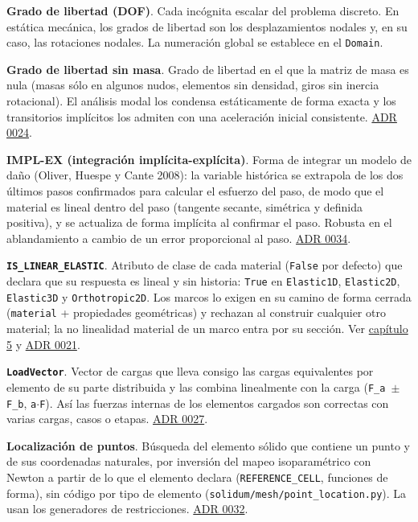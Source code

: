 \documentclass[11pt,oneside]{report}
\begin{document}
\textbf{Grado de libertad (DOF)}. Cada incógnita escalar del problema discreto. En estática mecánica, los grados de libertad son los desplazamientos nodales y, en su caso, las rotaciones nodales. La numeración global se establece en el \texttt{Domain}.

\textbf{Grado de libertad sin masa}. Grado de libertad en el que la matriz de masa es nula (masas sólo en algunos nudos, elementos sin densidad, giros sin inercia rotacional). El análisis modal los condensa estáticamente de forma exacta y los transitorios implícitos los admiten con una aceleración inicial consistente. \hyperref[adr:0024]{ADR 0024}.

\textbf{IMPL-EX (integración implícita-explícita)}. Forma de integrar un modelo de daño (Oliver, Huespe y Cante 2008): la variable histórica se extrapola de los dos últimos pasos confirmados para calcular el esfuerzo del paso, de modo que el material es lineal dentro del paso (tangente secante, simétrica y definida positiva), y se actualiza de forma implícita al confirmar el paso. Robusta en el ablandamiento a cambio de un error proporcional al paso. \hyperref[adr:0034]{ADR 0034}.

\textbf{\texttt{IS\_\allowbreak{}LINEAR\_\allowbreak{}ELASTIC}}. Atributo de clase de cada material (\texttt{False} por defecto) que declara que su respuesta es lineal y sin historia: \texttt{True} en \texttt{Elastic1D}, \texttt{Elastic2D}, \texttt{Elastic3D} y \texttt{Orthotropic2D}. Los marcos lo exigen en su camino de forma cerrada (\texttt{material} + propiedades geométricas) y rechazan al construir cualquier otro material; la no linealidad material de un marco entra por su sección. Ver \hyperref[cap:5]{capítulo 5} y \hyperref[adr:0021]{ADR 0021}.

\textbf{\texttt{LoadVector}}. Vector de cargas que lleva consigo las cargas equivalentes por elemento de su parte distribuida y las combina linealmente con la carga (\texttt{F\_a \ensuremath{\pm} F\_b}, \texttt{a\ensuremath{\cdot}F}). Así las fuerzas internas de los elementos cargados son correctas con varias cargas, casos o etapas. \hyperref[adr:0027]{ADR 0027}.

\textbf{Localización de puntos}. Búsqueda del elemento sólido que contiene un punto y de sus coordenadas naturales, por inversión del mapeo isoparamétrico con Newton a partir de lo que el elemento declara (\texttt{REFERENCE\_CELL}, funciones de forma), sin código por tipo de elemento (\texttt{solidum/\allowbreak{}mesh/\allowbreak{}point\_\allowbreak{}location.\allowbreak{}py}). La usan los generadores de restricciones. \hyperref[adr:0032]{ADR 0032}.
\end{document}
